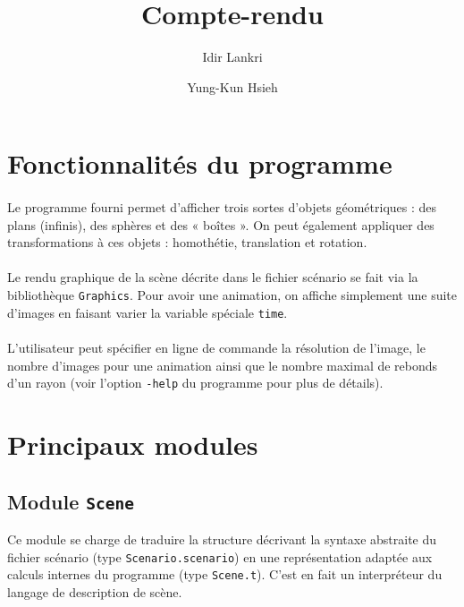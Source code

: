 \documentclass[a4paper,12pt,english,french]{article}
\author{Idir Lankri \and{} Yung-Kun Hsieh}
\title{Compte-rendu}
\date{}
\begin{document}
\maketitle{}

\section{Fonctionnalités du programme}
\label{sec:fonct-du-progr}

\paragraph{}

Le programme fourni permet d'afficher trois sortes d'objets
géométriques : des plans (infinis), des sphères et des « boîtes ».  On
peut également appliquer des transformations à ces objets : homothétie,
translation et rotation.

\paragraph{}

Le rendu graphique de la scène décrite dans le fichier scénario se fait
via la bibliothèque \texttt{Graphics}.  Pour avoir une animation, on
affiche simplement une suite d'images en faisant varier la variable
spéciale \texttt{time}.

\paragraph{}

L'utilisateur peut spécifier en ligne de commande la résolution de
l'image, le nombre d'images pour une animation ainsi que le nombre
maximal de rebonds d'un rayon (voir l'option \texttt{-help} du programme
pour plus de détails).

\section{Principaux modules}
\label{sec:principaux-modules}

\subsection{Module \texttt{Scene}}
\label{sec:scene-1}

Ce module se charge de traduire la structure décrivant la syntaxe
abstraite du fichier scénario (type \texttt{Scenario.scenario}) en une
représentation adaptée aux calculs internes du programme (type
\texttt{Scene.t}).  C'est en fait un interpréteur du langage de
description de scène.
\end{document}
